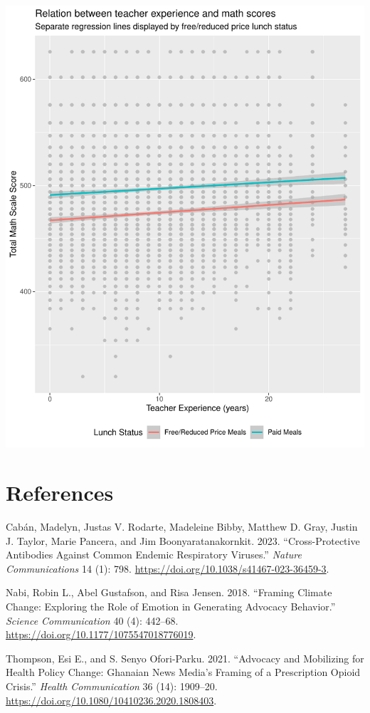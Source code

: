\documentclass[
  letterpaper,
  DIV=11,
  numbers=noendperiod]{scrartcl}
\newlength{\cslhangindent}
\newenvironment{CSLReferences}[2] %
 {\begin{list}{}{%
  \setlength{\itemindent}{0pt}
  \setlength{\leftmargin}{0pt}
  \setlength{\parsep}{0pt}
  \ifodd #1
   \setlength{\leftmargin}{\cslhangindent}
   \setlength{\itemindent}{-1\cslhangindent}
  \fi
  \setlength{\itemsep}{#2\baselineskip}}}
 {\end{list}}
\begin{document}
\includegraphics{hw_6_files/figure-pdf/unnamed-chunk-3-1.pdf}

\section*{References}\label{references}

\label{refs}
\begin{CSLReferences}{1}{0}
Cabán, Madelyn, Justas V. Rodarte, Madeleine Bibby, Matthew D. Gray,
Justin J. Taylor, Marie Pancera, and Jim Boonyaratanakornkit. 2023.
{``Cross-Protective Antibodies Against Common Endemic Respiratory
Viruses.''} \emph{Nature Communications} 14 (1): 798.
\url{https://doi.org/10.1038/s41467-023-36459-3}.

Nabi, Robin L., Abel Gustafson, and Risa Jensen. 2018. {``Framing
Climate Change: Exploring the Role of Emotion in Generating Advocacy
Behavior.''} \emph{Science Communication} 40 (4): 442--68.
\url{https://doi.org/10.1177/1075547018776019}.

Thompson, Esi E., and S. Senyo Ofori-Parku. 2021. {``Advocacy and
Mobilizing for Health Policy Change: Ghanaian News Media{'}s Framing of
a Prescription Opioid Crisis.''} \emph{Health Communication} 36 (14):
1909--20. \url{https://doi.org/10.1080/10410236.2020.1808403}.

\end{CSLReferences}
\end{document}

